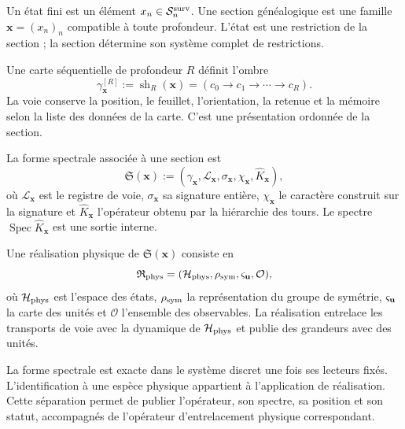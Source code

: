 \begin{definition}
\label{def:estado-finito-seccion-genealogica-md}
Un état fini est un élément
\(x_n\in\mathcal S_n^{\rm surv}\). Une section généalogique est une famille
\(\boldsymbol x=(x_n)_n\) compatible à toute profondeur. L'état est une
restriction de la section ; la section détermine son système complet de
restrictions.
\end{definition}

\begin{definition}
\label{def:ruta-observable-bisagra-md}
Une carte séquentielle de profondeur \(R\) définit l'ombre
\[
 \gamma_{\boldsymbol x}^{[R]}
 :=\operatorname{sh}_R(\boldsymbol x)
 =(c_0\to c_1\to\cdots\to c_R).
\]
La voie conserve la position, le feuillet, l'orientation, la retenue et la mémoire selon la
liste des données de la carte. C'est une présentation ordonnée de la section.
\end{definition}

\begin{definition}
\label{def:forma-espectral-numero-md}
La forme spectrale associée à une section est
\[
 \mathfrak S(\boldsymbol x)
 :=(\gamma_{\boldsymbol x},
    \mathcal L_{\boldsymbol x},
    \sigma_{\boldsymbol x},
    \chi_{\boldsymbol x},
    \widehat K_{\boldsymbol x}),
\]
où \(\mathcal L_{\boldsymbol x}\) est le registre de voie,
\(\sigma_{\boldsymbol x}\) sa signature entière, \(\chi_{\boldsymbol x}\) le
caractère construit sur la signature et \(\widehat K_{\boldsymbol x}\)
l'opérateur obtenu par la hiérarchie des tours. Le spectre
\(\operatorname{Spec}\widehat K_{\boldsymbol x}\) est une sortie interne.
\end{definition}

\begin{definition}
\label{def:realizacion-fisica-forma-espectral}
Une réalisation physique de \(\mathfrak S(\boldsymbol x)\) consiste en
\[
 \mathfrak R_{\rm phys}
 =(\mathcal H_{\rm phys},\rho_{\rm sym},\varsigma_{\bf u},\mathcal O),
\]
où \(\mathcal H_{\rm phys}\) est l'espace des états,
\(\rho_{\rm sym}\) la représentation du groupe de symétrie,
\(\varsigma_{\bf u}\) la carte des unités et \(\mathcal O\) l'ensemble des
observables. La réalisation entrelace les transports de voie avec la dynamique
de \(\mathcal H_{\rm phys}\) et publie des grandeurs avec des unités.
\end{definition}

La forme spectrale est exacte dans le système discret une fois ses
lecteurs fixés. L'identification à une espèce physique appartient à l'application de
réalisation. Cette séparation permet de publier l'opérateur, son spectre, sa
position et son statut, accompagnés de l'opérateur d'entrelacement physique correspondant.

